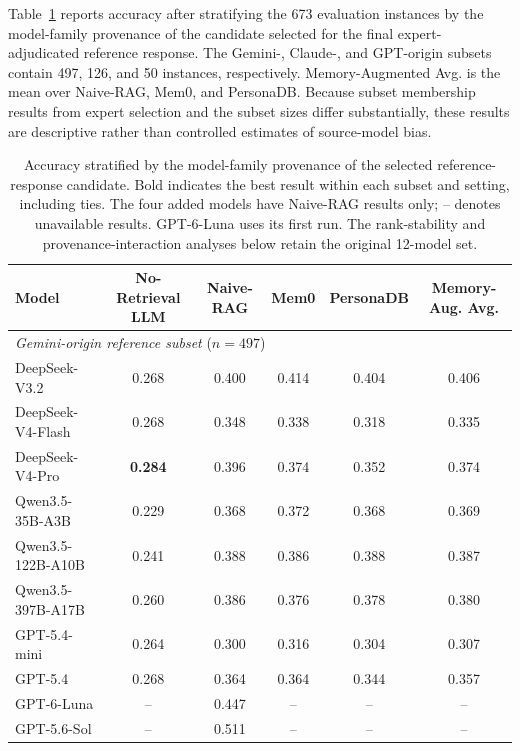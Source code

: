 \documentclass[11pt]{article}
\begin{document}
Table~\ref{tab:gt_source_results} reports accuracy after stratifying the 673 evaluation instances by the model-family provenance of the candidate selected for the final expert-adjudicated reference response. The Gemini-, Claude-, and GPT-origin subsets contain 497, 126, and 50 instances, respectively. Memory-Augmented Avg. is the mean over Naive-RAG, Mem0, and PersonaDB. Because subset membership results from expert selection and the subset sizes differ substantially, these results are descriptive rather than controlled estimates of source-model bias.

\begin{table}[!t]
\centering
\caption{Accuracy stratified by the model-family provenance of the selected reference-response candidate. Bold indicates the best result within each subset and setting, including ties. The four added models have Naive-RAG results only; -- denotes unavailable results. GPT-6-Luna uses its first run. The rank-stability and provenance-interaction analyses below retain the original 12-model set.}
\label{tab:gt_source_results}
\setlength{\tabcolsep}{5pt}
\scriptsize
\begin{tabular}{lc|ccc|c}
\toprule
\textbf{Model} & \textbf{No-Retrieval LLM} & \textbf{Naive-RAG} & \textbf{Mem0} & \textbf{PersonaDB} & \textbf{Memory-Aug. Avg.} \\
\midrule
\multicolumn{6}{l}{\textit{Gemini-origin reference subset} ($n=497$)} \\
\midrule
\quad DeepSeek-V3.2              & 0.268 & 0.400 & 0.414 & 0.404 & 0.406 \\
\quad DeepSeek-V4-Flash          & 0.268 & 0.348 & 0.338 & 0.318 & 0.335 \\
\quad DeepSeek-V4-Pro            & \textbf{0.284} & 0.396 & 0.374 & 0.352 & 0.374 \\
\quad Qwen3.5-35B-A3B            & 0.229 & 0.368 & 0.372 & 0.368 & 0.369 \\
\quad Qwen3.5-122B-A10B          & 0.241 & 0.388 & 0.386 & 0.388 & 0.387 \\
\quad Qwen3.5-397B-A17B          & 0.260 & 0.386 & 0.376 & 0.378 & 0.380 \\
\quad GPT-5.4-mini               & 0.264 & 0.300 & 0.316 & 0.304 & 0.307 \\
\quad GPT-5.4                    & 0.268 & 0.364 & 0.364 & 0.344 & 0.357 \\
\quad GPT-6-Luna                  & -- & 0.447 & -- & -- & -- \\
\quad GPT-5.6-Sol                 & -- & 0.511 & -- & -- & -- \\

\end{tabular}
\end{table}
\end{document}
